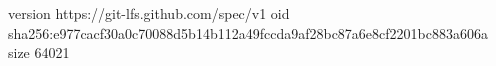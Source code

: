 version https://git-lfs.github.com/spec/v1
oid sha256:e977cacf30a0c70088d5b14b112a49fccda9af28bc87a6e8cf2201bc883a606a
size 64021
